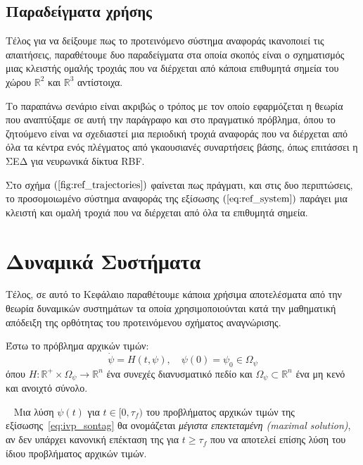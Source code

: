 \subsection{Παραδείγματα χρήσης}
Τέλος για να δείξουμε πως το προτεινόμενο σύστημα αναφοράς ικανοποιεί τις απαιτήσεις, παραθέτουμε δυο παραδείγματα στα οποία σκοπός είναι ο σχηματισμός μιας κλειστής ομαλής τροχιάς που να διέρχεται από κάποια επιθυμητά σημεία του χώρου $\mathbb{R}^2$ και $\mathbb{R}^3$ αντίστοιχα.

Το παραπάνω σενάριο είναι ακριβώς ο τρόπος με τον οποίο εφαρμόζεται η θεωρία που αναπτύξαμε σε αυτή την παράγραφο και στο πραγματικό πρόβλημα, όπου το ζητούμενο είναι να σχεδιαστεί μια περιοδική τροχιά αναφοράς που να διέρχεται από όλα τα κέντρα ενός πλέγματος από γκαουσιανές συναρτήσεις βάσης, όπως επιτάσσει η ΣΕΔ για νευρωνικά δίκτυα RBF.

Στο σχήμα $(\ref{fig:ref_trajectories})$ φαίνεται πως πράγματι, και στις δυο περιπτώσεις, το προσομοιωμένο σύστημα αναφοράς της εξίσωσης $(\ref{eq:ref_system})$ παράγει μια κλειστή και ομαλή τροχιά που να διέρχεται από όλα τα επιθυμητά σημεία.



\section{Δυναμικά Συστήματα} \label{sec:dynamical_systems}
Τέλος, σε αυτό το Κεφάλαιο παραθέτουμε κάποια χρήσιμα αποτελέσματα από την θεωρία δυναμικών συστημάτων τα οποία χρησιμοποιούνται κατά την μαθηματική απόδειξη της ορθότητας του προτεινόμενου σχήματος αναγνώρισης.

Έστω το πρόβλημα αρχικών τιμών:
\begin{equation}
	\dot{\psi} = H(t, \psi), \quad \psi(0) = \psi_0 \in \Omega_\psi
	\label{eq:ivp_sontag}
\end{equation}
όπου $H: \mathbb{R}^+ \times \Omega_\psi \rightarrow \mathbb{R}^n $ ένα συνεχές διανυσματικό πεδίο και $\Omega_\psi \subset \mathbb{R}^n$ ένα μη κενό και ανοιχτό σύνολο.\\

\begin{definition}\cite{sontag1998}~
	Μια λύση $\psi(t)$ για $t \in [0, \tau_f)$ του προβλήματος αρχικών τιμών της εξίσωσης~\eqref{eq:ivp_sontag} θα ονομάζεται \textit{μέγιστα επεκτεταμένη (maximal solution)}, αν δεν υπάρχει κανονική επέκταση της για $t \geq \tau_f$
	που να αποτελεί επίσης λύση του ίδιου προβλήματος αρχικών τιμών.\\
\end{definition}

